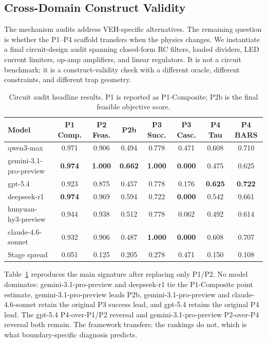 \subsection{Cross-Domain Construct Validity}

The mechanism audits address VEH-specific alternatives. The remaining question is whether the P1--P4 scaffold transfers when the physics changes. We instantiate a final circuit-design audit spanning closed-form RC filters, loaded dividers, LED current limiters, op-amp amplifiers, and linear regulators. It is not a circuit benchmark; it is a construct-validity check with a different oracle, different constraints, and different trap geometry.

\begin{table}[t]
\caption{Circuit audit headline results. P1 is reported as P1-Composite; P2b is the final feasible objective score.}
\label{tab:circuit_pilot_headline}
\centering
\scriptsize
\setlength{\tabcolsep}{4pt}
\renewcommand{\arraystretch}{1.08}
\begin{tabular}{lccccccc}
\toprule
Model & P1 Comp. & P2 Feas. & P2b & P3 Succ. & P3 Casc. & P4 Tau & P4 BARS \\
\midrule
qwen3-max       & 0.971 & 0.906 & 0.494 & 0.778 & 0.471 & 0.608 & 0.710 \\
gemini-3.1-pro-preview  & \textbf{0.974} & \textbf{1.000} & \textbf{0.662} & \textbf{1.000} & \textbf{0.000} & 0.475 & 0.625 \\
gpt-5.4         & 0.923 & 0.875 & 0.457 & 0.778 & 0.176 & \textbf{0.625} & \textbf{0.722} \\
deepseek-r1     & \textbf{0.974} & 0.969 & 0.594 & 0.722 & \textbf{0.000} & 0.542 & 0.661 \\
hunyuan-hy3-preview     & 0.944 & 0.938 & 0.512 & 0.778 & 0.062 & 0.492 & 0.614 \\
claude-4.6-sonnet      & 0.932 & 0.906 & 0.487 & \textbf{1.000} & \textbf{0.000} & 0.608 & 0.707 \\
\midrule
Stage spread & 0.051 & 0.125 & 0.205 & 0.278 & 0.471 & 0.150 & 0.108 \\
\bottomrule
\end{tabular}
\end{table}

Table~\ref{tab:circuit_pilot_headline} reproduces the main signature after replacing only P1/P2. No model dominates: gemini-3.1-pro-preview and deepseek-r1 tie the P1-Composite point estimate, gemini-3.1-pro-preview leads P2b, gemini-3.1-pro-preview and claude-4.6-sonnet retain the original P3 success lead, and gpt-5.4 retains the original P4 lead. The gpt-5.4 P4-over-P1/P2 reversal and gemini-3.1-pro-preview P2-over-P4 reversal both remain. The framework transfers; the rankings do not, which is what boundary-specific diagnosis predicts.
